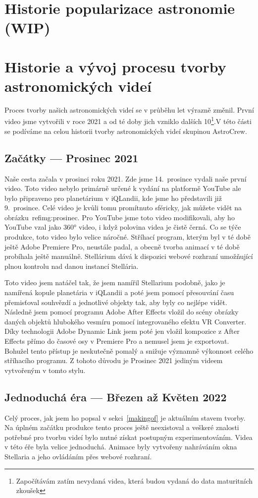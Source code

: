 \documentclass[12pt,a4paper,titlepage]{article}
\begin{document}
\section{Historie popularizace astronomie (WIP)}

\section{Historie a vývoj procesu tvorby astronomických videí}
Proces tvorby našich astronomických videí se v průběhu let výrazně změnil. První video jsme vytvořili v roce 2021 a od té doby jich vzniklo dalších 10\footnote{Započítávám zatím nevydaná videa, která budou vydaná do data maturitních zkoušek}.V této části se podíváme na celou historii tvorby astronomických videí skupinou AstroCrew.
\subsection{Začátky --- Prosinec 2021}
Naše cesta začala v prosinci roku 2021. Zde jsme 14.\ prosince vydali naše první video. Toto video nebylo primárně určené k vydání na platformě YouTube ale bylo připraveno pro planetárium v iQLandii, kde jsme ho představili již 9.\ prosince. Celé video je kvůli tomu promítnuto sféricky, jak můžete vidět na obrázku~ref{img:prosinec}. Pro YouTube jsme toto video modifikovali, aby ho YouTube vzal jako 360° video, i když polovina videa je čistě černá. Co se týče produkce, toto video bylo velice náročné. Stříhací program, kterým byl v té době ještě Adobe Premiere Pro, neustále padal, a obecně tvorba animací v té době probíhala ještě manuálně. Stellárium dává k dispozici webové rozhraní umožňující plnou kontrolu nad danou instancí Stellária. 

Toto video jsem natáčel tak, že jsem namířil Stellarium podobně, jako je namířená kopule planetária v iQLandii a poté jsem pomocí přesouvání času přemisťoval souhvězdí a jednotlivé objekty tak, aby byly co nejlépe vidět. Následně jsem pomocí programu Adobe After Effects vložil do scény obrázky daných objektů hlubokého vesmíru pomocí integrovaného efektu VR Converter. Díky technologii Adobe Dynamic Link jsem poté jen vložil kompozice z After Effects přímo do časové osy v Premiere Pro a nemusel jsem je exportovat. Bohužel tento přístup je neskutečně pomalý a snižuje významně výkonnost celého stříhacího programu. Z tohoto důvodu je Prosinec 2021 jediným videem vytvořeným v tomto stylu.
\subsection{Jednoduchá éra --- Březen až Květen 2022}
Celý proces, jak jsem ho popsal v sekci~\ref{makingof} je aktuálním stavem tvorby. Na úplném začátku produkce tento proces ještě neexistoval a veškeré znalosti potřebné pro tvorbu  videí bylo nutné získat postupným experimentováním. Videa v této éře byla velice jednoduchá. Animace byly vytvořeny nahráváním okna Stellaria a jeho ovládáním přes webové rozhraní. 
\end{document}
